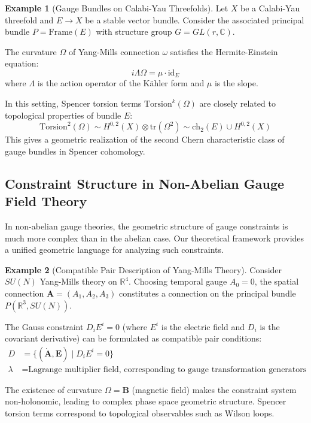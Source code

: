 \documentclass[a4paper,12pt]{extarticle}
\theoremstyle{definition}
\newtheorem{example}{Example}
\begin{document}
\begin{example}[Gauge Bundles on Calabi-Yau Threefolds]
Let $X$ be a Calabi-Yau threefold and $E \to X$ be a stable vector bundle. Consider the associated principal bundle $P = \text{Frame}(E)$ with structure group $G = GL(r, \mathbb{C})$.

The curvature $\Omega$ of Yang-Mills connection $\omega$ satisfies the Hermite-Einstein equation:
$$i\Lambda \Omega = \mu \cdot \text{id}_E$$
where $\Lambda$ is the action operator of the Kähler form and $\mu$ is the slope.

In this setting, Spencer torsion terms $\text{Torsion}^k(\Omega)$ are closely related to topological properties of bundle $E$:
$$\text{Torsion}^2(\Omega) \sim H^{0,2}(X) \otimes \text{tr}(\Omega^2) \sim \text{ch}_2(E) \cup H^{0,2}(X)$$
This gives a geometric realization of the second Chern characteristic class of gauge bundles in Spencer cohomology.
\end{example}

\subsection{Constraint Structure in Non-Abelian Gauge Field Theory}

In non-abelian gauge theories, the geometric structure of gauge constraints is much more complex than in the abelian case. Our theoretical framework provides a unified geometric language for analyzing such constraints.

\begin{example}[Compatible Pair Description of Yang-Mills Theory]
Consider $SU(N)$ Yang-Mills theory on $\mathbb{R}^4$. Choosing temporal gauge $A_0 = 0$, the spatial connection $\mathbf{A} = (A_1, A_2, A_3)$ constitutes a connection on the principal bundle $P(\mathbb{R}^3, SU(N))$.

The Gauss constraint $D_i E^i = 0$ (where $E^i$ is the electric field and $D_i$ is the covariant derivative) can be formulated as compatible pair conditions:
\begin{align}
D &= \{(\dot{\mathbf{A}}, \mathbf{E}) \mid D_i E^i = 0\}\\
\lambda &= \text{Lagrange multiplier field, corresponding to gauge transformation generators}
\end{align}

The existence of curvature $\Omega = \mathbf{B}$ (magnetic field) makes the constraint system non-holonomic, leading to complex phase space geometric structure. Spencer torsion terms correspond to topological observables such as Wilson loops.
\end{example}
\end{document}
